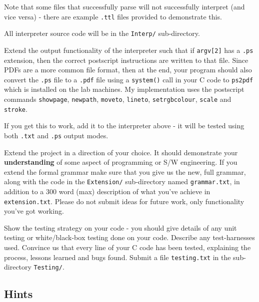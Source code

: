 \begin{exercise}
\noindent Note that some files that successfully parse will not
successfully interpret (and vice versa) - there are example \verb^.ttl^
files provided to demonstrate this.

\noindent All interpreter source code will be in the \verb^Interp/^ sub-directory.

\vspace*{1em}

\noindent Extend the output functionality of the
interpreter such that if \verb^argv[2]^ has a \verb^.ps^
extension, then the correct postscript instructions are written to that file.
 Since PDFs are a
more common file format, then at the end, your program should also convert the \verb^.ps^
file to a \verb^.pdf^ file using a \verb^system()^ call in your C code
to \verb^ps2pdf^ which is installed on the lab machines. 
My implementation uses the postscript commands \verb^showpage^,
\verb^newpath^, \verb^moveto^, \verb^lineto^, \verb^setrgbcolour^, \verb^scale^
and \verb^stroke^.

If you get this to work, add it to the interpreter above - it will be tested
using both \verb^.txt^ and \verb^.ps^ output modes.

\vspace*{1ex}

\noindent Extend the project in a direction of
your choice. It should demonstrate your {\bf understanding} of some aspect
of programming or S/W engineering. If you extend the formal grammar
make sure that you give us the new, full grammar, along with the code in
the \verb^Extension/^ sub-directory named \verb^grammar.txt^, in addition to
a $300$ word (max) description of what you've achieve in \verb^extension.txt^.
Please do not submit ideas for future work, only functionality you've got working.

\vspace*{1ex}

\noindent Show the testing strategy on your code -
you should give details of any
unit testing or white/black-box testing done on your code. Describe any
test-harnesses used. Convince us that every line of your C code has
been tested, explaining the process, lessons learned and bugs found.
Submit a file \verb^testing.txt^ in the sub-directory \verb^Testing/^.

\subsection*{Hints}
\begin{itemize}


\end{itemize}
\end{exercise}
